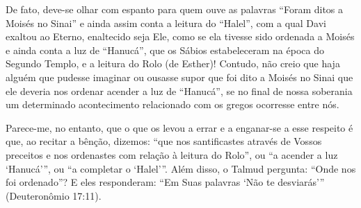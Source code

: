 De fato, deve-se olhar com espanto para quem ouve as palavras ``Foram
ditos a Moisés no Sinai'' e ainda assim conta a leitura do ``Halel'',
com a qual Davi exaltou ao Eterno, enaltecido seja Ele, como se ela
tivesse sido ordenada a Moisés e ainda conta a luz de ``Hanucá'', que
os Sábios estabeleceram na época do Segundo Templo, e a leitura do Rolo
(de Esther)! Contudo, não creio que haja alguém que pudesse imaginar ou
ousasse supor que foi dito a Moisés no Sinai que ele deveria nos ordenar
acender a luz de ``Hanucá'', se no final de nossa soberania um
determinado acontecimento relacionado com os gregos ocorresse entre nós.

Parece-me, no entanto, que o que os levou a errar e a enganar-se a esse
respeito é que, ao recitar a bênção, dizemos: ``que nos santificastes
através de Vossos preceitos e nos ordenastes com relação à leitura do
Rolo'', ou ``a acender a luz `Hanucá''', ou ``a completar o `Halel'''.
Além disso, o Talmud pergunta: ``Onde nos foi ordenado''? E eles
responderam: ``Em Suas palavras `Não te desviarás''' (Deuteronômio
17:11).

